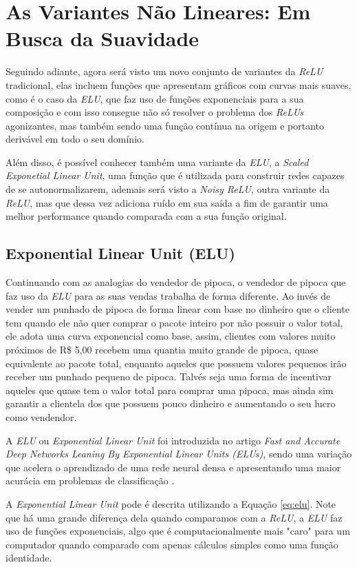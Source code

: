 \section{As Variantes Não Lineares: Em Busca da Suavidade}

Seguindo adiante, agora será visto um novo conjunto de variantes da \textit{ReLU} tradicional, elas incluem funções que apresentam gráficos com curvas mais suaves, como é o caso da \textit{ELU}, que faz uso de funções exponenciais para a sua composição e com isso consegue não só resolver o problema dos \textit{ReLUs} agonizantes, mas também sendo uma função contínua na origem e portanto derivável em todo o seu domínio.

Além disso, é possível conhecer também uma variante da \textit{ELU}, a \textit{Scaled Exponetial Linear Unit}, uma função que é utilizada para construir redes capazes de se autonormalizarem, ademais será visto a \textit{Noisy ReLU}, outra variante da \textit{ReLU}, mas que dessa vez adiciona ruído em sua saída a fim de garantir uma melhor performance quando comparada com a sua função original.

\subsection{Exponential Linear Unit (ELU)}

Continuando com as analogias do vendedor de pipoca, o vendedor de pipoca que faz uso da \textit{ELU} para as suas vendas trabalha de forma diferente. Ao invés de vender um punhado de pipoca de forma linear com base no dinheiro que o cliente tem quando ele não quer comprar o pacote inteiro por não possuir o valor total, ele adota uma curva exponencial como base, assim, clientes com valores muito próximos de R\$ 5,00 recebem uma quantia muito grande de pipoca, quase equivalente ao pacote total, enquanto aqueles que possuem valores pequenos irão receber um punhado pequeno de pipoca. Talvés seja uma forma de incentivar aqueles que quase tem o valor total para comprar uma pipoca, mas ainda sim garantir a clientela dos que possuem pouco dinheiro e aumentando o seu lucro como vendendor.

A \textit{ELU} ou \textit{Exponential Linear Unit} foi introduzida no artigo \textit{Fast and Accurate Deep Networks Leaning By Exponential Linear Units (ELUs)}, sendo uma variação que acelera o aprendizado de uma rede neural densa e apresentando uma maior acurácia em problemas de classificação \parencite{ELUArticle}.

A \textit{Exponential Linear Unit} pode é descrita utilizando a Equação \ref{eq:elu}. Note que há uma grande diferença dela quando comparamos com a \textit{ReLU}, a \textit{ELU} faz uso de funções exponenciais, algo que é computacionalmente mais "caro" para um computador quando comparado com apenas cálculos simples como uma função identidade.

